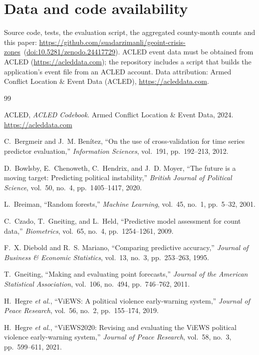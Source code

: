 \documentclass[11pt,a4paper]{article}
\newcommand{\repourl}{https://github.com/suadarzimanli/geoint-crisis-zones}
\newcommand{\archivedoi}{(\href{https://doi.org/10.5281/zenodo.24417729}{doi:10.5281/zenodo.24417729})}
\begin{document}
\section*{Data and code availability}

Source code, tests, the evaluation script, the aggregated county-month counts and this paper: \url{\repourl}~\archivedoi. ACLED event data must be obtained from ACLED (\url{https://acleddata.com}); the repository includes a script that builds the application's event file from an ACLED account. Data attribution: Armed Conflict Location \& Event Data (ACLED), \url{https://acleddata.com}.

\begin{thebibliography}{99}
\small

 ACLED, \emph{ACLED Codebook}. Armed Conflict Location \& Event Data, 2024. \url{https://acleddata.com}

 C.~Bergmeir and J.~M. Benítez, ``On the use of cross-validation for time series predictor evaluation,'' \emph{Information Sciences}, vol.~191, pp.~192--213, 2012.

 D.~Bowlsby, E.~Chenoweth, C.~Hendrix, and J.~D. Moyer, ``The future is a moving target: Predicting political instability,'' \emph{British Journal of Political Science}, vol.~50, no.~4, pp.~1405--1417, 2020.

 L.~Breiman, ``Random forests,'' \emph{Machine Learning}, vol.~45, no.~1, pp.~5--32, 2001.

 C.~Czado, T.~Gneiting, and L.~Held, ``Predictive model assessment for count data,'' \emph{Biometrics}, vol.~65, no.~4, pp.~1254--1261, 2009.

 F.~X. Diebold and R.~S. Mariano, ``Comparing predictive accuracy,'' \emph{Journal of Business \& Economic Statistics}, vol.~13, no.~3, pp.~253--263, 1995.

 T.~Gneiting, ``Making and evaluating point forecasts,'' \emph{Journal of the American Statistical Association}, vol.~106, no.~494, pp.~746--762, 2011.

 H.~Hegre \emph{et al.}, ``ViEWS: A political violence early-warning system,'' \emph{Journal of Peace Research}, vol.~56, no.~2, pp.~155--174, 2019.

 H.~Hegre \emph{et al.}, ``ViEWS2020: Revising and evaluating the ViEWS political violence early-warning system,'' \emph{Journal of Peace Research}, vol.~58, no.~3, pp.~599--611, 2021.


\end{thebibliography}
\end{document}
